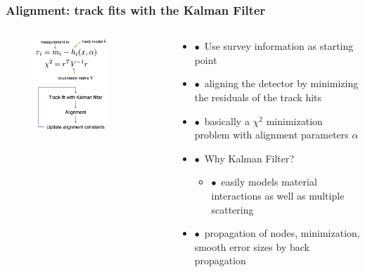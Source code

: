 \documentclass[aspectratio=1610, 12pt]{beamer}
\begin{document}
\begin{frame}\frametitle{Alignment: track fits with the Kalman Filter}
  \begin{columns}
    \begin{column}[c]{0.4\textwidth}
      \begin{figure}
        \centering
        \includegraphics[width=0.72\textwidth]{logos/kalman.png}
      \end{figure}
    \end{column}
    \begin{column}[c]{0.55\textwidth}
      \begin{itemize}
        \item $\bullet$\, Use survey information as starting point
        \item $\bullet$\, aligning the detector by minimizing the residuals of the track hits
        \item $\bullet$\, basically a $\chi^2$ minimization problem with alignment parameters $\alpha$
        \item $\bullet$\, Why Kalman Filter?
        \begin{itemize}
          \item $\bullet$\, easily models material interactions as well as multiple scattering
        \end{itemize}
        \item $\bullet$\, propagation of nodes, minimization, smooth error sizes by back propagation
      \end{itemize}
    \end{column}
  \end{columns}
\end{frame}
\end{document}
